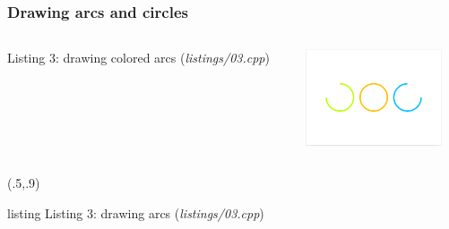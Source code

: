 \documentclass[aspectratio=169]{beamer}
\begin{document}
\begin{frame}[fragile]
\frametitle{Drawing arcs and circles}
\begin{columns}
  \begin{column}{0.7\textwidth}
    {\fontsize{3pt}{2.7}\selectfont
    
    \vspace{-12pt}
    }
    {\tiny \null\hfill{}Listing 3: drawing colored arcs (\textit{listings/03.cpp})}
  \end{column}
  \begin{column}{0.3\textwidth}
    \includegraphics[width=4cm,keepaspectratio]{pics/output_03_arcs.png}
  \end{column}
\end{columns}
\begin{textblock*}{\textwidth}(.5\textwidth,.9\textheight)
  \begin{beamercolorbox}[wd=.3\textwidth,left,sep=0.2cm]{listing}
    {\tiny Listing 3: drawing arcs (\textit{listings/03.cpp})}
  \end{beamercolorbox}
\end{textblock*}
\end{frame}
\end{document}
